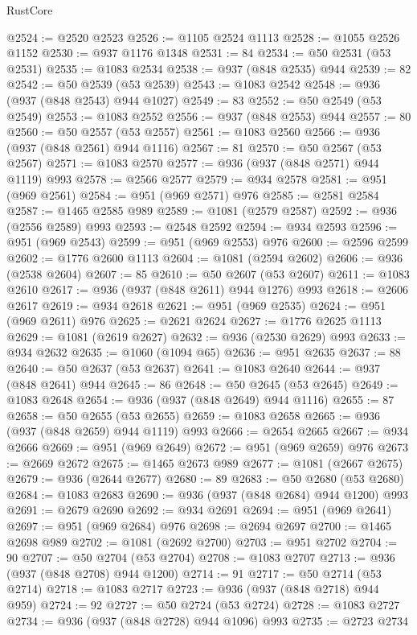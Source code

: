 \begin{lexlean}{RustCore}
\begin{coremodule}
@2524 := @2520 @2523
@2526 := @1105 @2524 @1113
@2528 := @1055 @2526 @1152
@2530 := @937 @1176 @1348
@2531 := 84
@2534 := @50 @2531 (@53 @2531)
@2535 := @1083 @2534
@2538 := @937 (@848 @2535) @944
@2539 := 82
@2542 := @50 @2539 (@53 @2539)
@2543 := @1083 @2542
@2548 := @936 (@937 (@848 @2543) @944 @1027)
@2549 := 83
@2552 := @50 @2549 (@53 @2549)
@2553 := @1083 @2552
@2556 := @937 (@848 @2553) @944
@2557 := 80
@2560 := @50 @2557 (@53 @2557)
@2561 := @1083 @2560
@2566 := @936 (@937 (@848 @2561) @944 @1116)
@2567 := 81
@2570 := @50 @2567 (@53 @2567)
@2571 := @1083 @2570
@2577 := @936 (@937 (@848 @2571) @944 @1119) @993
@2578 := @2566 @2577
@2579 := @934 @2578
@2581 := @951 (@969 @2561)
@2584 := @951 (@969 @2571) @976
@2585 := @2581 @2584
@2587 := @1465 @2585 @989
@2589 := @1081 (@2579 @2587)
@2592 := @936 (@2556 @2589) @993
@2593 := @2548 @2592
@2594 := @934 @2593
@2596 := @951 (@969 @2543)
@2599 := @951 (@969 @2553) @976
@2600 := @2596 @2599
@2602 := @1776 @2600 @1113
@2604 := @1081 (@2594 @2602)
@2606 := @936 (@2538 @2604)
@2607 := 85
@2610 := @50 @2607 (@53 @2607)
@2611 := @1083 @2610
@2617 := @936 (@937 (@848 @2611) @944 @1276) @993
@2618 := @2606 @2617
@2619 := @934 @2618
@2621 := @951 (@969 @2535)
@2624 := @951 (@969 @2611) @976
@2625 := @2621 @2624
@2627 := @1776 @2625 @1113
@2629 := @1081 (@2619 @2627)
@2632 := @936 (@2530 @2629) @993
@2633 := @934 @2632
@2635 := @1060 (@1094 @65)
@2636 := @951 @2635
@2637 := 88
@2640 := @50 @2637 (@53 @2637)
@2641 := @1083 @2640
@2644 := @937 (@848 @2641) @944
@2645 := 86
@2648 := @50 @2645 (@53 @2645)
@2649 := @1083 @2648
@2654 := @936 (@937 (@848 @2649) @944 @1116)
@2655 := 87
@2658 := @50 @2655 (@53 @2655)
@2659 := @1083 @2658
@2665 := @936 (@937 (@848 @2659) @944 @1119) @993
@2666 := @2654 @2665
@2667 := @934 @2666
@2669 := @951 (@969 @2649)
@2672 := @951 (@969 @2659) @976
@2673 := @2669 @2672
@2675 := @1465 @2673 @989
@2677 := @1081 (@2667 @2675)
@2679 := @936 (@2644 @2677)
@2680 := 89
@2683 := @50 @2680 (@53 @2680)
@2684 := @1083 @2683
@2690 := @936 (@937 (@848 @2684) @944 @1200) @993
@2691 := @2679 @2690
@2692 := @934 @2691
@2694 := @951 (@969 @2641)
@2697 := @951 (@969 @2684) @976
@2698 := @2694 @2697
@2700 := @1465 @2698 @989
@2702 := @1081 (@2692 @2700)
@2703 := @951 @2702
@2704 := 90
@2707 := @50 @2704 (@53 @2704)
@2708 := @1083 @2707
@2713 := @936 (@937 (@848 @2708) @944 @1200)
@2714 := 91
@2717 := @50 @2714 (@53 @2714)
@2718 := @1083 @2717
@2723 := @936 (@937 (@848 @2718) @944 @959)
@2724 := 92
@2727 := @50 @2724 (@53 @2724)
@2728 := @1083 @2727
@2734 := @936 (@937 (@848 @2728) @944 @1096) @993
@2735 := @2723 @2734

\end{coremodule}
\end{lexlean}
